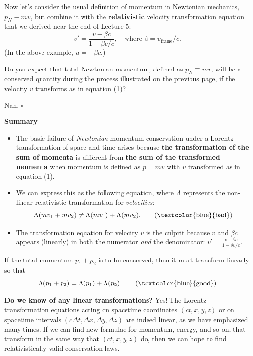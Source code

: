 \documentclass[11pt, letterpaper, openany]{book}
\newenvironment{exercise}[1][Exercise]{%
  \tcolorbox[blanker, breakable, left=1em,
    before skip=1em, after skip=1em,
    borderline west={3pt}{0pt}{PhysNavy},
    colback=PhysCream,
    before upper={\textcolor{PhysNavy}{\sffamily\bfseries #1:}\space}
  ]%
}{%
  \endtcolorbox%
}
\newenvironment{solution}[1][Solution]{%
  \tcolorbox[blanker, breakable, left=1em,
    before skip=1em, after skip=1em,
    borderline west={2pt}{0pt}{PhysTeal},
    colback=PhysCream,
    before upper={\textcolor{PhysTeal}{\sffamily\bfseries #1.}\space}
  ]%
}{%
  \hfill\textcolor{PhysTeal}{\ensuremath{\square}}\endtcolorbox%
}
\begin{document}
Now let's consider the usual definition of momentum in Newtonian mechanics, $p_N \equiv mv$, but combine it with the \textbf{relativistic} velocity transformation equation that we derived near the end of Lecture 5:
\begin{equation}
v' = \frac{v - \beta c}{1 - \beta v/c}, \quad \text{where } \beta = v_{\text{frame}}/c.
\end{equation}
(In the above example, $u = -\beta c$.)

\begin{exercise}[Exercise 2]
Do you expect that total Newtonian momentum, defined as $p_N \equiv mv$, will be a conserved quantity during the process illustrated on the previous page, if the velocity $v$ transforms as in equation (1)?
\end{exercise}
\begin{solution}
Nah.
\end{solution}

\textbf{Summary}
\begin{itemize}
    \item The basic failure of \textit{Newtonian} momentum conservation under a Lorentz transformation of space and time arises because \textbf{the transformation of the sum of momenta} is different from \textbf{the sum of the transformed momenta} when momentum is defined as $p = mv$ with $v$ transformed as in equation (1).
    \item We can express this as the following equation, where $\Lambda$ represents the non-linear relativistic transformation for \textit{velocities}:
    \[ \Lambda(mv_1 + mv_2) \neq \Lambda(mv_1) + \Lambda(mv_2). \tag{\textcolor{blue}{bad}} \]
    \item The transformation equation for velocity $v$ is the culprit because $v$ and $\beta c$ appears (linearly) in both the numerator \textit{and} the denominator: $v' = \frac{v - \beta c}{1 - \beta v/c}$.
\end{itemize}

If the total momentum $p_1 + p_2$ is to be conserved, then it must transform linearly so that
\[ \Lambda(p_1 + p_2) = \Lambda(p_1) + \Lambda(p_2). \tag{\textcolor{blue}{good}} \]

\textbf{Do we know of any linear transformations?} Yes! The Lorentz transformation equations acting on spacetime coordinates $(ct, x, y, z)$ or on spacetime intervals $(c\Delta t, \Delta x, \Delta y, \Delta z)$ are indeed linear, as we have emphasized many times. If we can find new formulae for momentum, energy, and so on, that transform in the same way that $(ct, x, y, z)$ do, then we can hope to find relativistically valid conservation laws.
\end{document}
